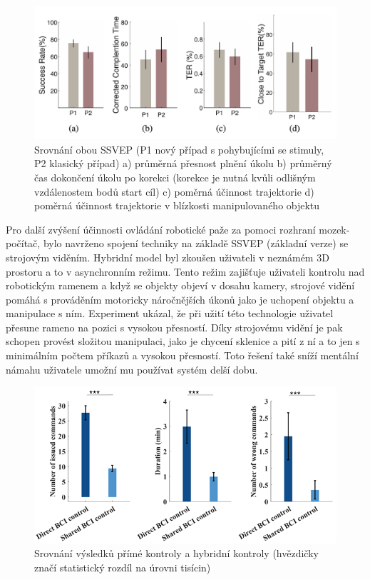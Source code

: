 \documentclass[a4paper,10pt]{article}
\theoremstyle{definition}
\begin{document}
\begin{figure}[h]
\begin{center}
\includegraphics[scale=0.5]{image/srovnanistrackemabez.PNG}
\caption{Srovnání obou SSVEP (P1 nový případ s pohybujícími se stimuly, P2 klasický případ) a) průměrná přesnost plnění úkolu b) průměrný čas dokončení úkolu po korekci (korekce je nutná kvůli odlišným vzdálenostem bodů start cíl) c) poměrná účinnost trajektorie d) poměrná účinnost trajektorie v blízkosti manipulovaného objektu \cite{AI2023obrazovky}}
\label{fig:3}
\end{center}
\end{figure}

\newpage
Pro další zvýšení účinnosti ovládání robotické paže za pomoci rozhraní mozek-počítač, bylo navrženo spojení techniky na základě SSVEP (základní verze) se strojovým viděním. Hybridní model byl zkoušen uživateli v neznámém 3D prostoru a to v asynchronním režimu. Tento režim zajišťuje uživateli kontrolu nad robotickým ramenem a když se objekty objeví v dosahu kamery, strojové vidění pomáhá s prováděním motoricky náročnějších úkonů jako je uchopení objektu a manipulace s ním. Experiment ukázal, že při užití této technologie uživatel přesune rameno na pozici s vysokou přesností. Díky strojovému vidění je pak schopen provést složitou manipulaci, jako je chycení sklenice a pití z ní a to jen s minimálním počtem příkazů a vysokou přesností. Toto řešení také sníží mentální námahu uživatele umožní mu používat systém delší dobu.\cite{zhou2023shared}


\begin{figure}[h]
\begin{center}
\includegraphics[scale=0.8]{image/strojovevideni.PNG}
\caption{Srovnání výsledků přímé kontroly a hybridní kontroly (hvězdičky značí statistický rozdíl na úrovni tisícin) \cite{zhou2023shared}}
\label{fig:4}
\end{center}
\end{figure}
\end{document}
